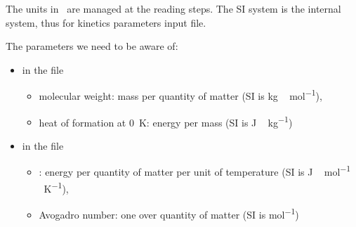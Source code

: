 The units in \antioch\ are managed at the reading
steps. The SI system is the internal system, thus
for kinetics parameters input file.


The parameters we need to be aware of:
\begin{itemize}
\item in the file 
        \begin{itemize}
        \item molecular weight: mass per quantity of matter (SI is \unit{kg\,mol^{-1}}),
        \item heat of formation at 0~\unit{K}: energy per mass (SI is \unit{J\,kg^{-1}})
        \end{itemize}
\item in the file 
        \begin{itemize}
        \item \Rg: energy per quantity of matter per unit of temperature (SI is \unit{J\,mol^{-1}\,K^{-1}}),
        \item Avogadro number: one over quantity of matter (SI is \unit{mol^{-1}})
        \end{itemize}
\end{itemize}

